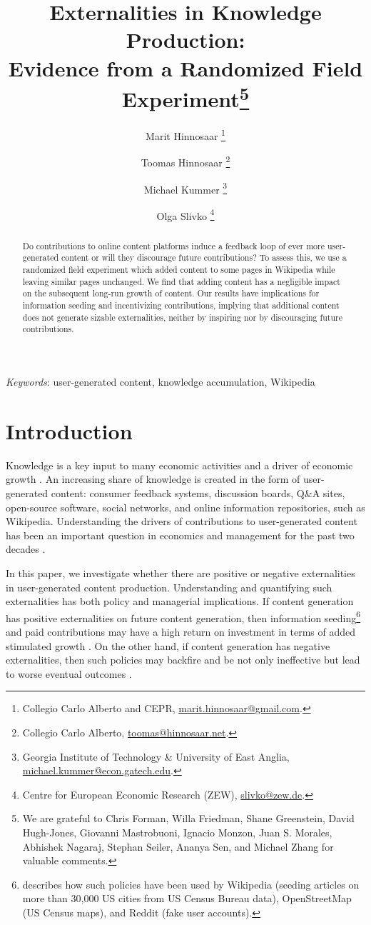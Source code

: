 \documentclass[12pt]{article}
\title{Externalities in Knowledge Production:\\ Evidence from a Randomized Field Experiment\thanks{We are grateful to Chris Forman, Willa Friedman, Shane Greenstein, David Hugh-Jones, Giovanni Mastrobuoni, Ignacio Monzon, Juan S. Morales, Abhishek Nagaraj, Stephan Seiler, Ananya Sen, and Michael Zhang for valuable comments.}}
\author{
Marit Hinnosaar%
\thanks{Collegio Carlo Alberto and CEPR, \href{mailto:marit.hinnosaar@gmail.com}{\url{marit.hinnosaar@gmail.com}}.%
}
\and
Toomas Hinnosaar%
\thanks{Collegio Carlo Alberto, \href{mailto:toomas@hinnosaar.net}{\url{toomas@hinnosaar.net}}. %
}
\and
Michael Kummer%
\thanks{Georgia Institute of Technology \& University of East Anglia, \href{mailto:michael.kummer@econ.gatech.edu}{\url{michael.kummer@econ.gatech.edu}}.%
}
\and
Olga Slivko%
\thanks{Centre for European Economic Research (ZEW), \href{mailto:slivko@zew.de}{\url{slivko@zew.de}}.%
}
}
\begin{document}
\maketitle
\begin{abstract}
Do contributions to online content platforms induce a feedback loop of ever more user-generated content or will they discourage future contributions? To assess this, we use a randomized field experiment which added content to some pages in Wikipedia while leaving similar pages unchanged. We find that adding content has a negligible impact on the subsequent long-run growth of content. Our results have implications for information seeding and incentivizing contributions, implying that additional content does not generate sizable externalities, neither by inspiring nor by discouraging future contributions.
\end{abstract}

\emph{Keywords}: user-generated content, knowledge accumulation, Wikipedia

\section{Introduction}

Knowledge is a key input to many economic activities and a driver of economic growth \citep{romer1990endogenous,grossman1993innovation,jones1995r}. An increasing share of knowledge is created in the form of user-generated content: consumer feedback systems, discussion boards, Q\&A sites, open-source software, social networks, and online information repositories, such as Wikipedia. Understanding the drivers of contributions to user-generated content has been an important question in economics and management for the past two decades \citep{lerner-tirole-2002}.

In this paper, we investigate whether there are positive or negative externalities in user-generated content production.
Understanding and quantifying such externalities has both policy and managerial implications. If content generation has positive externalities on future content generation, then information seeding\footnote{\cite{nagaraj2017information} describes how such policies have been used by Wikipedia (seeding articles on more than 30,000 US cities from US Census Bureau data), OpenStreetMap (US Census maps), and Reddit (fake user accounts).} and paid contributions may have a high return on investment in terms of added stimulated growth \citep{aaltonen-seiler-2016}.
On the other hand, if content generation has negative externalities, then such policies may backfire and be not only ineffective but lead to worse eventual outcomes \citep{nagaraj2017information}.
\end{document}

